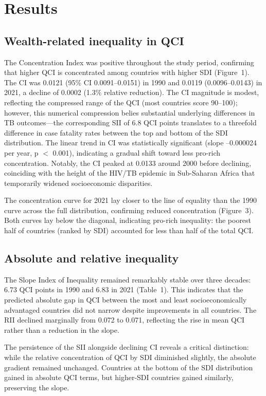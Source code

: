 \documentclass[12pt]{article}
\begin{document}
\section{Results}

\subsection{Wealth-related inequality in QCI}

The Concentration Index was positive throughout the study period, confirming that higher QCI is concentrated among countries with higher SDI (Figure~1). The CI was 0.0121 (95\% CI 0.0091--0.0151) in 1990 and 0.0119 (0.0096--0.0143) in 2021, a decline of 0.0002 (1.3\% relative reduction). The CI magnitude is modest, reflecting the compressed range of the QCI (most countries score 90--100); however, this numerical compression belies substantial underlying differences in TB outcomes---the corresponding SII of 6.8 QCI points translates to a threefold difference in case fatality rates between the top and bottom of the SDI distribution. The linear trend in CI was statistically significant (slope --0.000024 per year, p $<$ 0.001), indicating a gradual shift toward less pro-rich concentration. Notably, the CI peaked at 0.0133 around 2000 before declining, coinciding with the height of the HIV/TB epidemic in Sub-Saharan Africa that temporarily widened socioeconomic disparities.

The concentration curve for 2021 lay closer to the line of equality than the 1990 curve across the full distribution, confirming reduced concentration (Figure~3). Both curves lay below the diagonal, indicating pro-rich inequality: the poorest half of countries (ranked by SDI) accounted for less than half of the total QCI.

\subsection{Absolute and relative inequality}

The Slope Index of Inequality remained remarkably stable over three decades: 6.73 QCI points in 1990 and 6.83 in 2021 (Table~1). This indicates that the predicted absolute gap in QCI between the most and least socioeconomically advantaged countries did not narrow despite improvements in all countries. The RII declined marginally from 0.072 to 0.071, reflecting the rise in mean QCI rather than a reduction in the slope.

The persistence of the SII alongside declining CI reveals a critical distinction: while the relative concentration of QCI by SDI diminished slightly, the absolute gradient remained unchanged. Countries at the bottom of the SDI distribution gained in absolute QCI terms, but higher-SDI countries gained similarly, preserving the slope.
\end{document}
